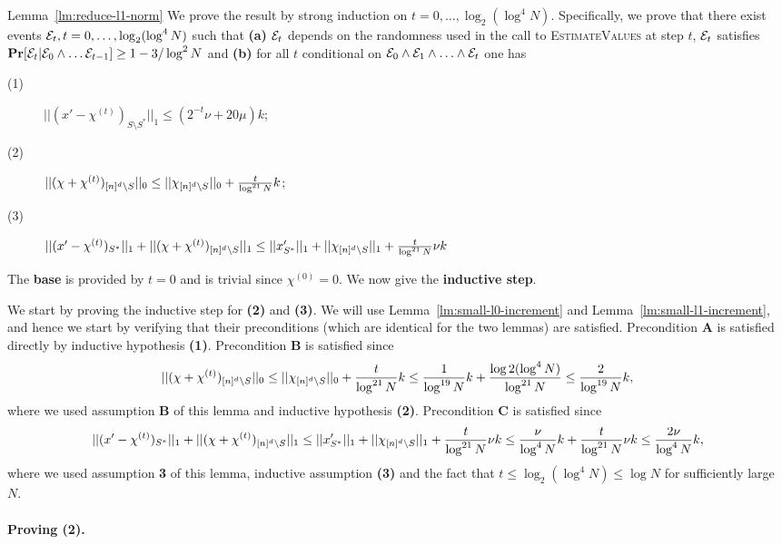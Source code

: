 \begin{proofof}{Lemma~\ref{lm:reduce-l1-norm}}
We prove the result by strong induction on $t=0,\ldots, \log_2 (\log^4 N)$. Specifically, we prove that there exist events ${\mathcal{E}}_t, t=0,\ldots, \log_2 (\log^4 N)$ such that {\bf (a)} ${\mathcal{E}}_t$ depends on the randomness used in the call to \textsc{EstimateValues} at step $t$, ${\mathcal{E}}_t$ satisfies ${\bf \mbox{\bf Pr}}[{\mathcal{E}}_t|{\mathcal{E}}_0\wedge \ldots {\mathcal{E}}_{t-1}]\geq 1-3/\log^2 N$ and {\bf (b)} for all $t$ conditional on ${\mathcal{E}}_0\wedge {\mathcal{E}}_1\wedge\ldots\wedge{\mathcal{E}}_t$ one has
\begin{description}
\item[(1)] $||(x'-\chi^{(t)})_{S\setminus S^*}||_1\leq (2^{-t}\nu+20\mu) k$;
\item[(2)] $||(\chi+\chi^{(t)})_{{[n]^d}\setminus S}||_0\leq ||\chi_{{[n]^d}\setminus S}||_0+\frac{t}{\log^{21} N}k$;
\item[(3)] $||(x'-\chi^{(t)})_{S^*}||_1+||(\chi+\chi^{(t)})_{{[n]^d}\setminus S}||_1\leq ||x'_{S^*}||_1+||\chi_{{[n]^d}\setminus S}||_1+\frac{t}{\log^{21} N}\nu k$
\end{description}

The {\bf base} is provided by $t=0$ and is trivial since $\chi^{(0)}=0$. We now give the {\bf inductive step}.

We start by proving the inductive step for {\bf (2)} and {\bf (3)}.  We will use Lemma~\ref{lm:small-l0-increment} and Lemma~\ref{lm:small-l1-increment}, and hence we start by verifying that their preconditions (which are identical for the two lemmas) are satisfied. Precondition {\bf A} is satisfied directly by inductive hypothesis {\bf (1)}. Precondition {\bf B} is satisfied since 
$$
||(\chi+\chi^{(t)})_{{[n]^d}\setminus S}||_0\leq ||\chi_{{[n]^d}\setminus S}||_0+\frac{t}{\log^{21} N}k\leq \frac1{\log^{19} N} k+\frac{\log2(\log^4 N)}{\log^{21} N}\leq \frac2{\log^{19} N} k,
$$
where we used assumption {\bf B} of this lemma and inductive hypothesis {\bf (2)}. Precondition {\bf C} is satisfied since 
$$
||(x'-\chi^{(t)})_{S^*}||_1+||(\chi+\chi^{(t)})_{{[n]^d}\setminus S}||_1\leq  ||x'_{S^*}||_1+||\chi_{{[n]^d}\setminus S}||_1+\frac{t}{\log^{21} N}\nu k \leq \frac{\nu}{\log^4 N} k
+\frac{t}{\log^{21} N}\nu k\leq \frac{2\nu}{\log^4 N} k,
$$
where we used assumption {\bf 3} of this lemma, inductive assumption {\bf (3)} and the fact that $t\leq \log_2 (\log^4 N)\leq \log N$ for sufficiently large $N$.

\paragraph{Proving {\bf (2)}.}


\end{proofof}
